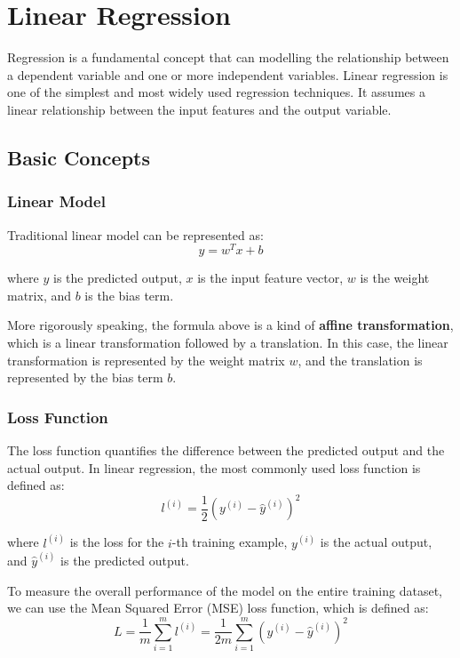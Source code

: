 \chapter{Linear Regression}

Regression is a fundamental concept that can modelling the relationship between a dependent variable and one or more independent variables. Linear regression is one of the simplest and most widely used regression techniques. It assumes a linear relationship between the input features and the output variable.

\section{Basic Concepts}

\subsection{Linear Model}

Traditional linear model can be represented as:
\[
y = w^T x + b
\]

where \(y\) is the predicted output, \(x\) is the input feature vector, \(w\) is the weight matrix, and \(b\) is the bias term.

More rigorously speaking, the formula above is a kind of \textbf{affine transformation}, which is a linear transformation followed by a translation. In this case, the linear transformation is represented by the weight matrix \(w\), and the translation is represented by the bias term \(b\).

\subsection{Loss Function}

The loss function quantifies the difference between the predicted output and the actual output. In linear regression, the most commonly used loss function is defined as:
\[
l^{(i)} = \frac{1}{2}(y^{(i)} - \hat{y}^{(i)})^2
\]

where \(l^{(i)}\) is the loss for the \(i\)-th training example, \(y^{(i)}\) is the actual output, and \(\hat{y}^{(i)}\) is the predicted output.

To measure the overall performance of the model on the entire training dataset, we can use the Mean Squared Error (MSE) loss function, which is defined as:
\[
L = \frac{1}{m} \sum_{i=1}^{m} l^{(i)} = \frac{1}{2m} \sum_{i=1}^{m} (y^{(i)} - \hat{y}^{(i)})^2
\]

